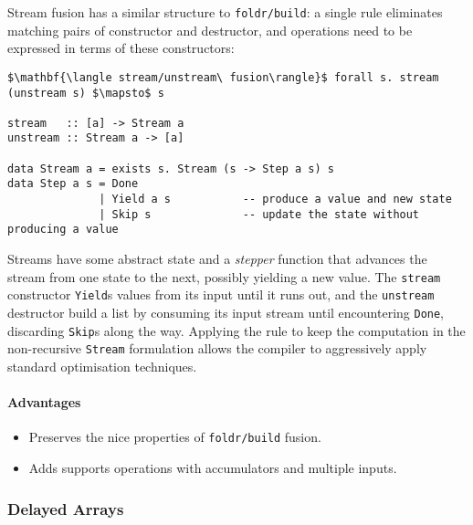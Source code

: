 Stream fusion has a similar structure to \texttt{foldr/build}: a single rule
eliminates matching pairs of constructor and destructor, and operations need to
be expressed in terms of these constructors:
%
\begin{lstlisting}[style=Haskell,numbers=none,mathescape,caption={The \emph{stream fusion} transformation}]
$\mathbf{\langle stream/unstream\ fusion\rangle}$ forall s. stream (unstream s) $\mapsto$ s

stream   :: [a] -> Stream a
unstream :: Stream a -> [a]

data Stream a = exists s. Stream (s -> Step a s) s
data Step a s = Done
              | Yield a s           -- produce a value and new state
              | Skip s              -- update the state without producing a value
\end{lstlisting}

Streams have some abstract state and a \emph{stepper} function that advances the
stream from one state to the next, possibly yielding a new value. The
\texttt{stream} constructor \texttt{Yield}s values from its input until it runs
out, and the \texttt{unstream} destructor build a list by consuming its input
stream until encountering \texttt{Done}, discarding \texttt{Skip}s along the
way. Applying the rule to keep the computation in the non-recursive
\texttt{Stream} formulation allows the compiler to aggressively apply standard
optimisation techniques.

\paragraph{Advantages}
\begin{itemize}
    \item Preserves the nice properties of \texttt{foldr/build} fusion.
    \item Adds supports operations with accumulators and multiple inputs.
\end{itemize}

%


\subsubsection{Delayed Arrays}

